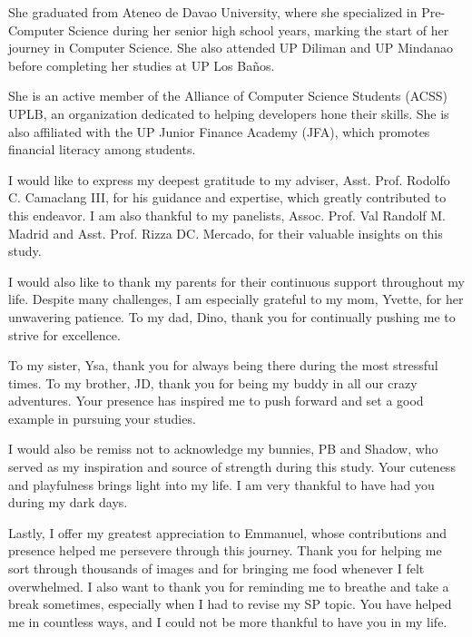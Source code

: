\documentclass{icsthesis}
\begin{document}
\begin{frontmatter}
\begin{biosketch}
            She graduated from Ateneo de Davao University, where she specialized in Pre-Computer Science during her senior high school years, marking the start of her journey in Computer Science. She also attended UP Diliman and UP Mindanao before completing her studies at UP Los Baños.
            
            She is an active member of the Alliance of Computer Science Students (ACSS) UPLB, an organization dedicated to helping developers hone their skills. She is also affiliated with the UP Junior Finance Academy (JFA), which promotes financial literacy among students.
			
			\addauthorsignaturefield
		\end{biosketch}	
		
		\begin{acknowledgement}
			I would like to express my deepest gratitude to my adviser, Asst. Prof. Rodolfo C. Camaclang III, for his guidance and expertise, which greatly contributed to this endeavor. I am also thankful to my panelists, Assoc. Prof. Val Randolf M. Madrid and Asst. Prof. Rizza DC. Mercado, for their valuable insights on this study.

            I would also like to thank my parents for their continuous support throughout my life. Despite many challenges, I am especially grateful to my mom, Yvette, for her unwavering patience. To my dad, Dino, thank you for continually pushing me to strive for excellence. 

            To my sister, Ysa, thank you for always being there during the most stressful times. To my brother, JD, thank you for being my buddy in all our crazy adventures. Your presence has inspired me to push forward and set a good example in pursuing your studies. 
            
            I would also be remiss not to acknowledge my bunnies, PB and Shadow, who served as my inspiration and source of strength during this study. Your cuteness and playfulness brings light into my life. I am very thankful to have had you during my dark days. 
            
            Lastly, I offer my greatest appreciation to Emmanuel, whose contributions and presence helped me persevere through this journey. Thank you for helping me sort through thousands of images and for bringing me food whenever I felt overwhelmed. I also want to thank you for reminding me to breathe and take a break sometimes, especially when I had to revise my SP topic. You have helped me in countless ways, and I could not be more thankful to have you in my life.
		\end{acknowledgement}
		

\end{frontmatter}
\end{document}

